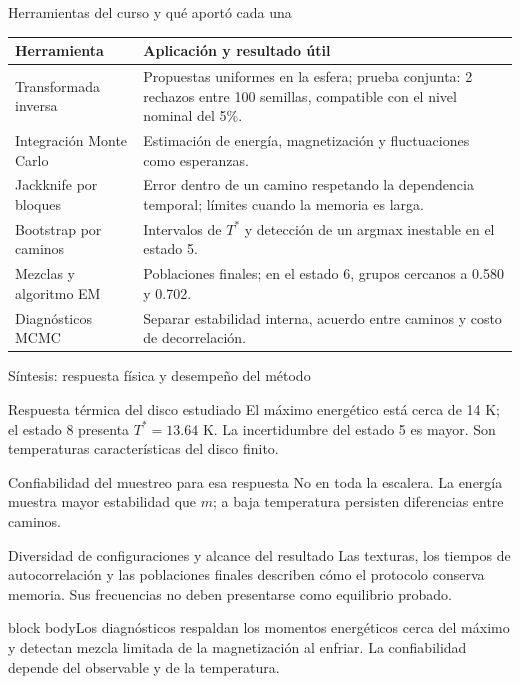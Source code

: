 \documentclass[aspectratio=169,10pt]{beamer}
\newcommand{\idea}[1]{\vspace{2pt}\begin{beamercolorbox}[rounded=true,sep=5pt,wd=\linewidth]{block body}\small #1\end{beamercolorbox}}
\begin{document}
\begin{frame}{Herramientas del curso y qué aportó cada una}
\small
\renewcommand{\arraystretch}{1.25}
\begin{tabularx}{\linewidth}{p{3.3cm}X}
\toprule
Herramienta & Aplicación y resultado útil\\\midrule
Transformada inversa & Propuestas uniformes en la esfera; prueba conjunta: 2 rechazos entre 100 semillas, compatible con el nivel nominal del 5\%.\\
Integración Monte Carlo & Estimación de energía, magnetización y fluctuaciones como esperanzas.\\
Jackknife por bloques & Error dentro de un camino respetando la dependencia temporal; límites cuando la memoria es larga.\\
Bootstrap por caminos & Intervalos de $T^*$ y detección de un argmax inestable en el estado 5.\\
Mezclas y algoritmo EM & Poblaciones finales; en el estado 6, grupos cercanos a 0.580 y 0.702.\\
Diagnósticos MCMC & Separar estabilidad interna, acuerdo entre caminos y costo de decorrelación.\\\bottomrule
\end{tabularx}
\end{frame}

\begin{frame}{Síntesis: respuesta física y desempeño del método}
\small
\begin{block}{Respuesta térmica del disco estudiado}
El máximo energético está cerca de 14 K; el estado 8 presenta $T^*=13.64$ K. La incertidumbre del estado 5 es mayor. Son temperaturas características del disco finito.
\end{block}
\begin{block}{Confiabilidad del muestreo para esa respuesta}
No en toda la escalera. La energía muestra mayor estabilidad que $m$; a baja temperatura persisten diferencias entre caminos.
\end{block}
\begin{block}{Diversidad de configuraciones y alcance del resultado}
Las texturas, los tiempos de autocorrelación y las poblaciones finales describen cómo el protocolo conserva memoria. Sus frecuencias no deben presentarse como equilibrio probado.
\end{block}
\idea{Los diagnósticos respaldan los momentos energéticos cerca del máximo y detectan mezcla limitada de la magnetización al enfriar. La confiabilidad depende del observable y de la temperatura.}
\end{frame}
\end{document}
